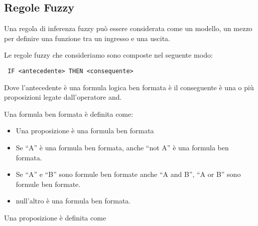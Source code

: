 \subsection{Regole Fuzzy}

Una regola di inferenza fuzzy può essere considerata come un modello, un mezzo per definire una funzione tra un ingresso e una uscita.

Le regole fuzzy che consideriamo sono composte nel seguente modo:
\begin{verbatim}
 IF <antecedente> THEN <consequente>
\end{verbatim}

Dove l'antecedente è una formula logica ben formata è il conseguente è una o più proposizioni legate dall'operatore and.

Una formula ben formata è definita come:

\begin{itemize}
 \item Una proposizione è una formula ben formata
 \item Se ``A'' è una formula ben formata, anche ``not A'' è una formula ben formata.
 \item Se ``A'' e ``B'' sono formule ben formate anche ``A and B'', ``A or B'' sono formule ben formate.
 \item null'altro è una formula ben formata.
\end{itemize}

Una proposizione è definita come 
